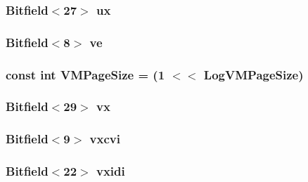 \hypertarget{namespacePowerISA_a5ebba2175dff4330c2758b038b5fe3b4}{
\subsubsection[{ux}]{\setlength{\rightskip}{0pt plus 5cm}Bitfield$<$27$>$ {\bf ux}}}
\label{namespacePowerISA_a5ebba2175dff4330c2758b038b5fe3b4}
\hypertarget{namespacePowerISA_ad4dee47434647869e86af6c9a1532c4c}{
\subsubsection[{ve}]{\setlength{\rightskip}{0pt plus 5cm}Bitfield$<$8$>$ {\bf ve}}}
\label{namespacePowerISA_ad4dee47434647869e86af6c9a1532c4c}
\hypertarget{namespacePowerISA_a891eaf95159d764e6efae501c2860a3a}{
\subsubsection[{VMPageSize}]{\setlength{\rightskip}{0pt plus 5cm}const int {\bf VMPageSize} = (1 $<$$<$ {\bf LogVMPageSize})}}
\label{namespacePowerISA_a891eaf95159d764e6efae501c2860a3a}
\hypertarget{namespacePowerISA_aa86e07da1b9cc370b9d96d14eac0a104}{
\subsubsection[{vx}]{\setlength{\rightskip}{0pt plus 5cm}Bitfield$<$29$>$ {\bf vx}}}
\label{namespacePowerISA_aa86e07da1b9cc370b9d96d14eac0a104}
\hypertarget{namespacePowerISA_a94d7f439bb54d3d17a16e882442f505e}{
\subsubsection[{vxcvi}]{\setlength{\rightskip}{0pt plus 5cm}Bitfield$<$9$>$ {\bf vxcvi}}}
\label{namespacePowerISA_a94d7f439bb54d3d17a16e882442f505e}
\hypertarget{namespacePowerISA_ae5384444aa0a3bd461aa69023dbea786}{
\subsubsection[{vxidi}]{\setlength{\rightskip}{0pt plus 5cm}Bitfield$<$22$>$ {\bf vxidi}}}
